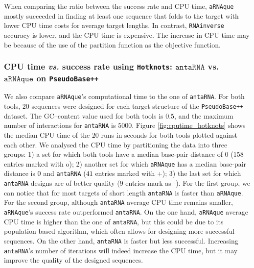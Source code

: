 When comparing the ratio between the success rate and CPU time, \texttt{aRNAque}  mostly succeeded in finding at least one sequence that folds to the target with lower CPU time costs for average target lengths. In contrast, \texttt{RNAinverse} accuracy is lower, and the CPU time is expensive. The increase in CPU time may be because of the use of the partition function as the objective function.


\subsubsection{CPU time \emph{vs.} success rate using \texttt{Hotknots}: \(\texttt{antaRNA}\) vs. \(\texttt{aRNAque}\) on \texttt{PseudoBase++}}
We also compare \texttt{aRNAque}'s computational time to the one of \texttt{antaRNA}. For both tools, $20$ sequences were designed for each target structure of the \texttt{PseudoBase++} dataset. The GC--content value used for both tools is $0.5$, and the maximum number of interactions for  \texttt{antaRNA} is $5000$. 
Figure {\ref{fig:cputime_hotknots}} shows the median CPU time of the $20$ runs in seconds for both tools plotted against each other. We analysed the CPU time by partitioning the data into three groups: 1) a set for which both tools have a median base-pair distance of 0 ($158$ entries marked with o); 2) another set for which \texttt{aRNAque} has a median base-pair distance is 0 and \texttt{antaRNA} ($41$ entries marked with +); 3) the last set for which \texttt{antaRNA} designs are of better quality ($9$ entries mark as -). For the first group, we can notice that for most targets of short length \texttt{antaRNA} is faster than \texttt{aRNAque}. For the second group, although \texttt{antaRNA} average CPU time remains smaller, \texttt{aRNAque}'s success rate outperformed \texttt{antaRNA}.  On the one hand,  \texttt{aRNAque} average CPU time is higher than the one of \texttt{antaRNA}, but this could be due to its population-based algorithm, which often allows for designing more successful sequences. On the other hand, \texttt{antaRNA} is faster but less successful. Increasing \texttt{antaRNA}'s number of iterations will indeed increase the CPU time, but it may improve the quality of the designed sequences.

